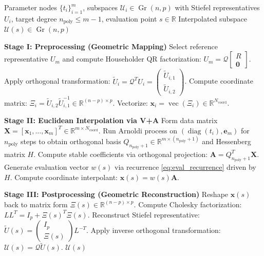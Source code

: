 \documentclass[11pt]{article}
\DeclareMathOperator{\Gr}{Gr}
\begin{document}
\begin{algorithm}[H]
\caption{Grassmann Lagrange Interpolation via MV-V+A}
\label{alg:grassmann_l}
\begin{algorithmic}[1]
\REQUIRE Parameter nodes $\{t_i\}_{i=1}^m$, subspaces $\mathcal{U}_i \in \Gr(n, p)$ with Stiefel representatives $U_i$, target degree $n_{\text{poly}} \le m-1$, evaluation point $s \in \mathbb{R}$
\ENSURE Interpolated subspace $\mathcal{U}(s) \in \Gr(n, p)$

\medskip
\STATE \textbf{Stage I: Preprocessing (Geometric Mapping)}
\STATE Select reference representative $U_m$ and compute Householder QR factorization: $U_m = \mathcal{Q} \begin{bmatrix} R \\ \mathbf{0} \end{bmatrix}$.
\STATE Apply orthogonal transformation: $\tilde{U}_i = \mathcal{Q}^T U_i = \begin{pmatrix} \tilde{U}_{i,1} \\ \tilde{U}_{i,2} \end{pmatrix}$.
\STATE Compute coordinate matrix: $\Xi_i = \tilde{U}_{i,2} \tilde{U}_{i,1}^{-1} \in \mathbb{R}^{(n-p) \times p}$.
\STATE Vectorize: $\mathbf{x}_i = \operatorname{vec}(\Xi_i) \in \mathbb{R}^{N_{\text{coord}}}$.
\ENDFOR

\medskip
\STATE \textbf{Stage II: Euclidean Interpolation via V+A}
\STATE Form data matrix $\mathbf{X} = [\mathbf{x}_1, \ldots, \mathbf{x}_m]^T \in \mathbb{R}^{m \times N_{\text{coord}}}$.
\STATE Run Arnoldi process on $( \operatorname{diag}(t_i), \mathbf{e}_m )$ for $n_{\text{poly}}$ steps to obtain orthogonal basis $Q_{n_{\text{poly}}+1} \in \mathbb{R}^{m \times (n_{\text{poly}}+1)}$ and Hessenberg matrix $H$.
\STATE Compute stable coefficients via orthogonal projection: $\mathbf{A} = Q_{n_{\text{poly}}+1}^T \mathbf{X}$.
\STATE Generate evaluation vector $w(s)$ via recurrence \eqref{eq:eval_recurrence} driven by $H$.
\STATE Compute coordinate interpolant: $\mathbf{x}(s) = w(s) \mathbf{A}$.

\medskip
\STATE \textbf{Stage III: Postprocessing (Geometric Reconstruction)}
\STATE Reshape $\mathbf{x}(s)$ back to matrix form $\Xi(s) \in \mathbb{R}^{(n-p) \times p}$.
\STATE Compute Cholesky factorization: $L L^T = I_p + \Xi(s)^T \Xi(s)$.
\STATE Reconstruct Stiefel representative: $\widetilde U(s) = \begin{pmatrix} I_p \\ \Xi(s) \end{pmatrix} L^{-T}$.
\STATE Apply inverse orthogonal transformation: $\mathcal{U}(s) = \mathcal{Q} \widetilde U(s)$.
\RETURN $\mathcal{U}(s)$
\end{algorithmic}
\end{algorithm}
\end{document}

